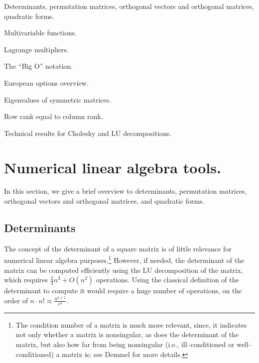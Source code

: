 
\noindent Determinants, permutation matrices, orthogonal vectors and orthogonal matrices,
quadratic forms.
\medskip

\noindent Multivariable functions.
\medskip

\noindent Lagrange multipliers.
\medskip

\noindent The ``Big O'' notation.
\medskip

\noindent European options overview.
\medskip

\noindent Eigenvalues of symmetric matrices.
\medskip

\noindent Row rank equal to column rank.
\medskip

\noindent Technical results for Cholesky and LU decompositions.
\medskip

\section{Numerical linear algebra tools.}

In this section, we give a brief overview to determinants, permutation matrices,
orthogonal vectors and orthogonal matrices, and quadratic forms.

\subsection{Determinants}

The concept of the determinant of a square matrix is of little relevance for numerical
linear algebra purposes.\footnote{The condition number of a matrix is much more relevant,
since, it indicates not only whether a matrix is nonsingular, as does the determinant of
the matrix, but also how far from being nonsingular (i.e., ill--conditioned or
well--conditioned) a matrix is; see Demmel \cite{13} for more details.} However, if
needed, the determinant of the matrix can be computed efficiently using the LU
decomposition of the matrix, which requires $\frac23 n^3 + O(n^2)$ operations. Using the
classical definition of the determinant to compute it would require a huge number of
operations, on the order of $n \cdot n! \approx \frac{n^{n+1}}{e^n}$.

